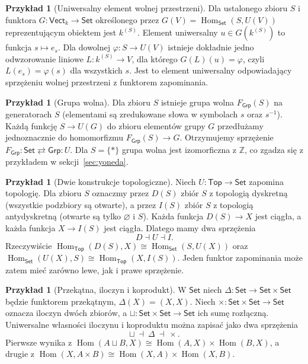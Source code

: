\documentclass[11pt,a4paper]{article}
\numberwithin{equation}{section}
\theoremstyle{plain}
\theoremstyle{definition}
\newtheorem{przyklad}[twierdzenie]{Przykład}
\theoremstyle{remark}
\newcommand{\cat}[1]{\mathsf{#1}}
\newcommand{\Set}{\cat{Set}}
\newcommand{\Grp}{\cat{Grp}}
\newcommand{\Top}{\cat{Top}}
\newcommand{\Vect}{\cat{Vect}}
\newcommand{\Hom}{\operatorname{Hom}}
\begin{document}
\begin{przyklad}[Uniwersalny element wolnej przestrzeni]
Dla ustalonego zbioru $S$ i funktora $G:\Vect_k\to\Set$ określonego przez $G(V)=\Hom_{\Set}(S,U(V))$ reprezentującym obiektem jest $k^{(S)}$. Element uniwersalny $u\in G(k^{(S)})$ to funkcja $s\mapsto e_s$. Dla dowolnej $\varphi:S\to U(V)$ istnieje dokładnie jedno odwzorowanie liniowe $L:k^{(S)}\to V$, dla którego $G(L)(u)=\varphi$, czyli $L(e_s)=\varphi(s)$ dla wszystkich $s$. Jest to element uniwersalny odpowiadający sprzężeniu wolnej przestrzeni z funktorem zapominania.
\end{przyklad}

\begin{przyklad}[Grupa wolna]
Dla zbioru $S$ istnieje grupa wolna $F_{\Grp}(S)$ na generatorach $S$ (elementami są zredukowane słowa w symbolach $s$ oraz $s^{-1}$). Każdą funkcję $S\to U(G)$ do zbioru elementów grupy $G$ przedłużamy jednoznacznie do homomorfizmu $F_{\Grp}(S)\to G$. Otrzymujemy sprzężenie $F_{\Grp}:\Set\rightleftarrows\Grp:U$. Dla $S=\{*\}$ grupa wolna jest izomorficzna z $\mathbb Z$, co zgadza się z przykładem w sekcji~\ref{sec:yoneda}.
\end{przyklad}

\begin{przyklad}[Dwie konstrukcje topologiczne]
Niech $U:\Top\to\Set$ zapomina topologię. Dla zbioru $S$ oznaczmy przez $D(S)$ zbiór $S$ z topologią dyskretną (wszystkie podzbiory są otwarte), a przez $I(S)$ zbiór $S$ z topologią antydyskretną (otwarte są tylko $\varnothing$ i $S$). Każda funkcja $D(S)\to X$ jest ciągła, a każda funkcja $X\to I(S)$ jest ciągła. Dlatego mamy dwa sprzężenia
\[
D\dashv U\dashv I.
\]
Rzeczywiście $\Hom_{\Top}(D(S),X)\cong\Hom_{\Set}(S,U(X))$ oraz $\Hom_{\Set}(U(X),S)\cong\Hom_{\Top}(X,I(S))$. Jeden funktor zapominania może zatem mieć zarówno lewe, jak i prawe sprzężenie.
\end{przyklad}

\begin{przyklad}[Przekątna, iloczyn i koprodukt]\label{przyklad:diag-adj}
W $\Set$ niech $\Delta:\Set\to\Set\times\Set$ będzie funktorem przekątnym, $\Delta(X)=(X,X)$. Niech $\times:\Set\times\Set\to\Set$ oznacza iloczyn dwóch zbiorów, a $\sqcup:\Set\times\Set\to\Set$ ich sumę rozłączną. Uniwersalne własności iloczynu i koproduktu można zapisać jako dwa sprzężenia
\[
\sqcup\ \dashv\ \Delta\ \dashv\ \times.
\]
Pierwsze wynika z $\Hom(A\sqcup B,X)\cong\Hom(A,X)\times\Hom(B,X)$, a drugie z $\Hom(X,A\times B)\cong\Hom(X,A)\times\Hom(X,B)$.
\end{przyklad}
\end{document}
